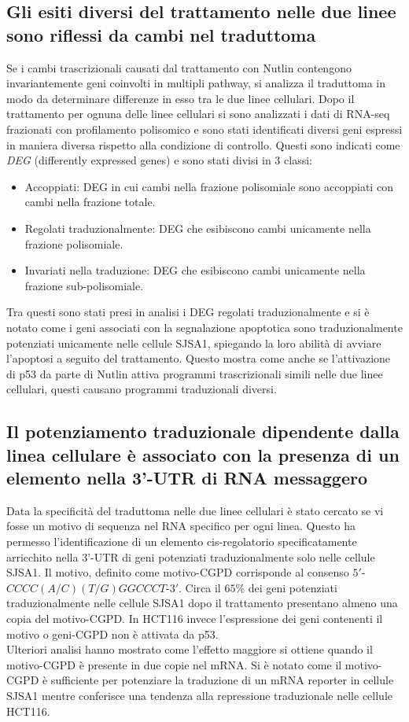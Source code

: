   \subsection{Gli esiti diversi del trattamento nelle due linee sono riflessi da cambi nel traduttoma}
  Se i cambi trascrizionali causati dal trattamento con Nutlin contengono invariantemente geni coinvolti in multipli pathway, si analizza il traduttoma in modo da determinare differenze in esso tra le due linee cellulari.
  Dopo il trattamento per ognuna delle linee cellulari si sono analizzati i dati di RNA-seq frazionati con profilamento polisomico e sono stati identificati diversi geni espressi in maniera diversa rispetto alla condizione di controllo.
  Questi sono indicati come \emph{DEG} (differently expressed genes) e sono stati divisi in $3$ classi:
  \begin{itemize}
    \item Accoppiati: DEG in cui cambi nella frazione polisomiale sono accoppiati con cambi nella frazione totale.
    \item Regolati traduzionalmente: DEG che esibiscono cambi unicamente nella frazione polisomiale.
    \item Invariati nella traduzione: DEG che esibiscono cambi unicamente nella frazione sub-polisomiale.
  \end{itemize}
  Tra questi sono stati presi in analisi i DEG regolati traduzionalmente e si \`e notato come i geni associati con la segnalazione apoptotica sono traduzionalmente potenziati unicamente nelle cellule SJSA1, spiegando la loro abilit\`a di avviare l'apoptosi a seguito del trattamento.
  Questo mostra come anche se l'attivazione di p53 da parte di Nutlin attiva programmi trascrizionali simili nelle due linee cellulari, questi causano programmi traduzionali diversi.

  \subsection{Il potenziamento traduzionale dipendente dalla linea cellulare \`e associato con la presenza di un elemento nella 3'-UTR di RNA messaggero}
  \label{subsec:cgpd}
  Data la specificit\`a del traduttoma nelle due linee cellulari \`e stato cercato se vi fosse un motivo di sequenza nel RNA specifico per ogni linea.
  Questo ha permesso l'identificazione di un elemento cis-regolatorio specificatamente arricchito nella 3'-UTR di geni potenziati traduzionalmente solo nelle cellule SJSA1.
  Il motivo, definito come motivo-CGPD corrisponde al consenso $5'$-$CCCC(A/C)(T/G)GGCCCT$-$3'$.
  Circa il $65\%$ dei geni potenziati traduzionalmente nelle cellule SJSA1 dopo il trattamento presentano almeno una copia del motivo-CGPD.
  In HCT116 invece l'espressione dei geni contenenti il motivo o geni-CGPD non \`e attivata da p53.\\
  Ulteriori analisi hanno mostrato come l'effetto maggiore si ottiene quando il motivo-CGPD \`e presente in due copie nel mRNA.
  Si \`e notato come il motivo-CGPD \`e sufficiente per potenziare la traduzione di un mRNA reporter in cellule SJSA1 mentre conferisce una tendenza alla repressione traduzionale nelle cellule HCT116.


